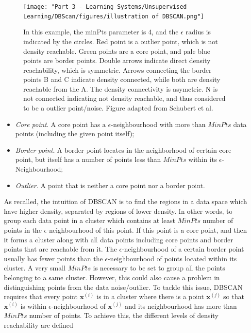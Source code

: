 \begin{figure}[tbp]
	\centering
	\texttt{[image: "Part 3 - Learning Systems/Unsupervised Learning/DBScan/figures/illustration of 
		DBSCAN.png"]}
	\caption{In this example, the minPts parameter is 4, and the $\epsilon$ 
		radius is indicated by the circles. Red point is a outlier point, which 
		is 
		not density reachable. Green points are a core point, and pale blue 
		points 
		are border points. Double arrows indicate direct density reachability, 
		which is symmetric. Arrows connecting the border points B and C 
		indicate 
		density connected, while both are density reachable from the A. The 
		density 
		connectivity is asymetric. N is not connected indicating not density 
		reachable, and thus considered to be a outlier point/noise. Figure adapted from 
		Schubert et al. 
		\cite{schubert2017dbscan}
	}
	\label{fig:relation}
\end{figure}



\begin{itemize}


\item\textit{Core point}. A core point has a $\epsilon$-neighbourhood with more than $MinPts$ data points (including the given point itself); 

\item\textit{Border point}. A border point locates in the neighborhood of certain core point, but itself has a number of points less than $MinPts$ within its $\epsilon$-Neighbourhood;


\item\textit{Outlier}. A point that is neither a core point nor a 
border point. 
	
\end{itemize}

As recalled, the intuition of DBSCAN is to find the regions in a data space 
which have higher density, separated by regions of lower density. In other 
words, to group each data point in a cluster which contains at least $MinPts$ 
number of points in the $\epsilon$-neighbourhood of this point. If this point is a core point, and then it forms a cluster along with all data points including core points and border points that are reachable from it. The $\epsilon$-neighbourhood of a certain border point usually has fewer points than the 
$\epsilon$-neighbourhood of points located within its cluster. A very small 
$MinPts$ is necessary to be set to group all the points belonging to a same 
cluster. However, this could also cause a problem in distinguishing points from 
the data noise/outlier. To tackle this issue, DBSCAN requires that every 
point $\mathbf{x}^{(i)}$ is in a cluster where there is a point $\mathbf{x}^{(j)}$ so 
that $\mathbf{x}^{(i)}$ is within $\epsilon$-neighbourhood of $\mathbf{x}^{(j)}$ 
and its neighbourhood has more than $MinPts$ number of points. To achieve this, 
the different levels of density reachability are defined \cite{ester1996density}


